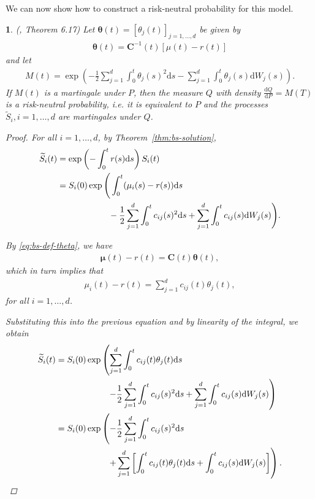 \documentclass[english]{article}
\numberwithin{equation}{section}
\numberwithin{figure}{section}
\theoremstyle{bolddescit}
\newtheorem{theorem}{\protect\theoremname}[section]
\theoremstyle{definition}
\theoremstyle{definition}
\theoremstyle{plain}
\theoremstyle{plain}
\theoremstyle{bolddesc}
\theoremstyle{plain}
\theoremstyle{remark}
\providecommand{\theoremname}{Theorem}
\begin{document}
We can now show how to construct a risk-neutral probability for this model.

\begin{theorem}\label{thm:bs-risk-neutral-prob}
  (\cite{capinski_blackscholes_2012}, Theorem 6.17)
  Let $\mathbf{\theta}(t) = [\theta_j(t)]_{j=1,\ldots,d}$ be given by
  \begin{align}\label{eq:bs-def-theta}
    \mathbf{\theta}(t) = \mathbf{C}^{-1}(t) [\mu(t) - r(t)]
  \end{align}
  and let
  \begin{align*}
    M(t) = \exp \left( - \frac{1}{2} \sum_{j=1}^d \int_0^t \theta_j(s)^2 \mathrm{d}s - \sum_{j=1}^d \int_0^t \theta_j(s) \mathrm{d}W_j(s) \right).
  \end{align*}
  If $M(t)$ is a martingale under $P$, then the measure $Q$ with density $\frac{\mathrm{d}Q}{\mathrm{d}P} = M(T)$ is a risk-neutral probability, i.e. it is equivalent to $P$ and the processes $\widetilde{S}_i, i=1,\ldots,d$ are martingales under $Q$.

  \begin{proof}
    For all $i=1,\ldots,d$, by Theorem~\ref{thm:bs-solution},
    \begin{align*}
      \widetilde{S}_i(t)
      &= \exp\left(- \int_0^t r(s)\mathrm{d}s\right) S_i(t)\\
      &= S_i(0) \exp \Bigg( \int_0^t (\mu_i(s) - r(s)) \mathrm{d}s \\
      &\hspace*{60pt} - \frac{1}{2} \sum_{j=1}^{d} \int_0^t c_{ij}(s)^2 \mathrm{d}s + \sum_{j=1}^d \int_0^t c_{ij}(s) \mathrm{d}W_j(s) \Bigg).
    \end{align*}

    By \eqref{eq:bs-def-theta}, we have
    \begin{align*}
      \mathbf{\mu}(t) - r(t) = \mathbf{C}(t) \mathbf{\theta}(t),
    \end{align*}
    which in turn implies that
    \begin{align*}
      \mu_i(t) - r(t) = \sum_{j=1}^d c_{ij}(t) \theta_j(t),
    \end{align*}
    for all $i=1,\ldots,d$.

    Substituting this into the previous equation and by linearity of the integral, we obtain
    \begin{align}
      \widetilde{S}_i(t)
      &= S_i(0) \exp \left( \sum_{j=1}^d \int_0^t c_{ij}(t) \theta_j(t) \mathrm{d}s \right.\notag\\
      &\hspace*{60pt} \left. - \frac{1}{2} \sum_{j=1}^{d} \int_0^t c_{ij}(s)^2 \mathrm{d}s + \sum_{j=1}^d \int_0^t c_{ij}(s) \mathrm{d}W_j(s) \right)\notag\\
      &= S_i(0) \exp \left( - \frac{1}{2} \sum_{j=1}^{d} \int_0^t c_{ij}(s)^2 \mathrm{d}s \right.\notag\\
      &\hspace*{60pt} \left. + \sum_{j=1}^d \left[\int_0^t c_{ij}(t) \theta_j(t) \mathrm{d}s + \int_0^t c_{ij}(s) \mathrm{d}W_j(s) \right]\right).\label{eq:bs-risk-neutral-before-product-rule}
    \end{align}


\end{proof}
\end{theorem}
\end{document}
